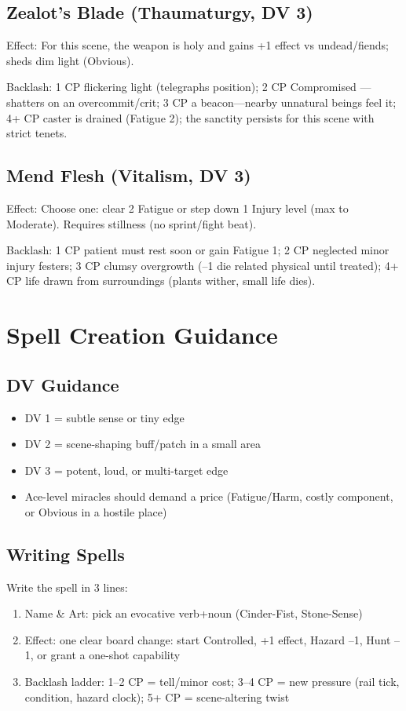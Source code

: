 \subsection{Zealot's Blade (Thaumaturgy, DV 3)}
Effect: For this scene, the weapon is holy and gains +1 effect vs undead/fiends; sheds dim light (Obvious).

Backlash: 1 CP flickering light (telegraphs position); 2 CP Compromised ---shatters on an overcommit/crit; 3 CP a beacon---nearby unnatural beings feel it; 4+ CP caster is drained (Fatigue 2); the sanctity persists for this scene with strict tenets.

\subsection{Mend Flesh (Vitalism, DV 3)}
Effect: Choose one: clear 2 Fatigue or step down 1 Injury level (max to Moderate). Requires stillness (no sprint/fight beat).

Backlash: 1 CP patient must rest soon or gain Fatigue 1; 2 CP neglected minor injury festers; 3 CP clumsy overgrowth (--1 die related physical until treated); 4+ CP life drawn from surroundings (plants wither, small life dies).

\section{Spell Creation Guidance}

\subsection{DV Guidance}
\begin{itemize}
\item DV 1 = subtle sense or tiny edge
\item DV 2 = scene-shaping buff/patch in a small area
\item DV 3 = potent, loud, or multi-target edge
\item Ace-level miracles should demand a price (Fatigue/Harm, costly component, or Obvious in a hostile place)
\end{itemize}

\subsection{Writing Spells}
Write the spell in 3 lines:
\begin{enumerate}
\item Name \& Art: pick an evocative verb+noun (Cinder-Fist, Stone-Sense)
\item Effect: one clear board change: start Controlled, +1 effect, Hazard --1, Hunt --1, or grant a one-shot capability
\item Backlash ladder: 1--2 CP = tell/minor cost; 3--4 CP = new pressure (rail tick, condition, hazard clock); 5+ CP = scene-altering twist
\end{enumerate}

